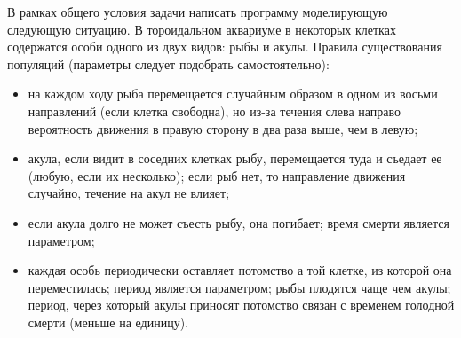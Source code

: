 \begin{zztask}
В рамках общего условия задачи написать программу моделирующую следующую 
ситуацию.
В тороидальном аквариуме в некоторых клетках содержатся особи одного из 
двух видов: рыбы и акулы. Правила существования популяций (параметры следует
подобрать самостоятельно):
\begin{itemize}
	\item на каждом ходу рыба перемещается случайным образом в одном из восьми 
	направлений (если клетка свободна), но из-за течения слева направо вероятность 
	движения в правую сторону в два раза выше, чем в левую;
	\item акула, если видит в соседних клетках рыбу, перемещается туда и съедает 
	ее (любую, если их несколько); если рыб нет, то направление движения случайно, 
	течение на акул не влияет;
	\item если акула долго не может съесть рыбу, она погибает; время смерти является 
	параметром;
	\item каждая особь периодически оставляет потомство а той клетке, из которой она 
	переместилась; период является параметром; рыбы плодятся чаще чем акулы; период, 
	через который акулы приносят потомство связан с временем голодной смерти (меньше 
	на единицу).
\end{itemize}
\end{zztask}


